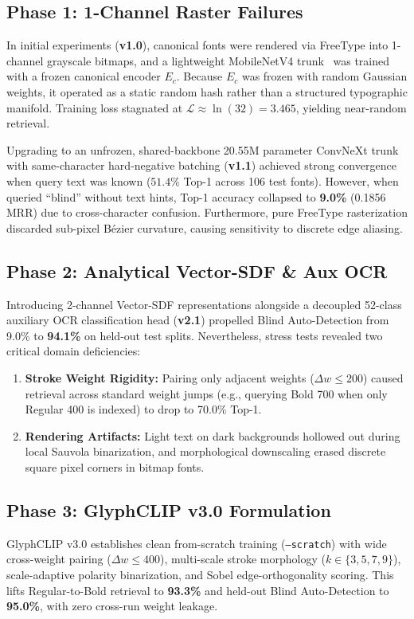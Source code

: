\documentclass[10pt,twocolumn,letterpaper]{article}
\begin{document}
\subsection{Phase 1: 1-Channel Raster Failures}
In initial experiments (\textbf{v1.0}), canonical fonts were rendered via FreeType into 1-channel grayscale bitmaps, and a lightweight MobileNetV4 trunk~\cite{qin2024mobilenetv4} was trained with a frozen canonical encoder $E_c$. Because $E_c$ was frozen with random Gaussian weights, it operated as a static random hash rather than a structured typographic manifold. Training loss stagnated at $\mathcal{L} \approx \ln(32) = 3.465$, yielding near-random retrieval.

Upgrading to an unfrozen, shared-backbone 20.55M parameter ConvNeXt trunk~\cite{Liu_2022_CVPR} with same-character hard-negative batching (\textbf{v1.1}) achieved strong convergence when query text was known ($51.4\%$ Top-1 across 106 test fonts). However, when queried ``blind'' without text hints, Top-1 accuracy collapsed to \textbf{9.0\%} (0.1856 MRR) due to cross-character confusion. Furthermore, pure FreeType rasterization discarded sub-pixel Bézier curvature, causing sensitivity to discrete edge aliasing.

\subsection{Phase 2: Analytical Vector-SDF \& Aux OCR}
Introducing 2-channel Vector-SDF representations alongside a decoupled 52-class auxiliary OCR classification head (\textbf{v2.1}) propelled Blind Auto-Detection from 9.0\% to \textbf{94.1\%} on held-out test splits. Nevertheless, stress tests revealed two critical domain deficiencies:
\begin{enumerate}
    \item \textbf{Stroke Weight Rigidity:} Pairing only adjacent weights ($\Delta w \le 200$) caused retrieval across standard weight jumps (e.g., querying Bold 700 when only Regular 400 is indexed) to drop to 70.0\% Top-1.
    \item \textbf{Rendering Artifacts:} Light text on dark backgrounds hollowed out during local Sauvola binarization, and morphological downscaling erased discrete square pixel corners in bitmap fonts.
\end{enumerate}

\subsection{Phase 3: GlyphCLIP v3.0 Formulation}
GlyphCLIP v3.0 establishes clean from-scratch training (\texttt{--scratch}) with wide cross-weight pairing ($\Delta w \le 400$), multi-scale stroke morphology ($k \in \{3, 5, 7, 9\}$), scale-adaptive polarity binarization, and Sobel edge-orthogonality scoring. This lifts Regular-to-Bold retrieval to \textbf{93.3\%} and held-out Blind Auto-Detection to \textbf{95.0\%}, with zero cross-run weight leakage.
\end{document}
